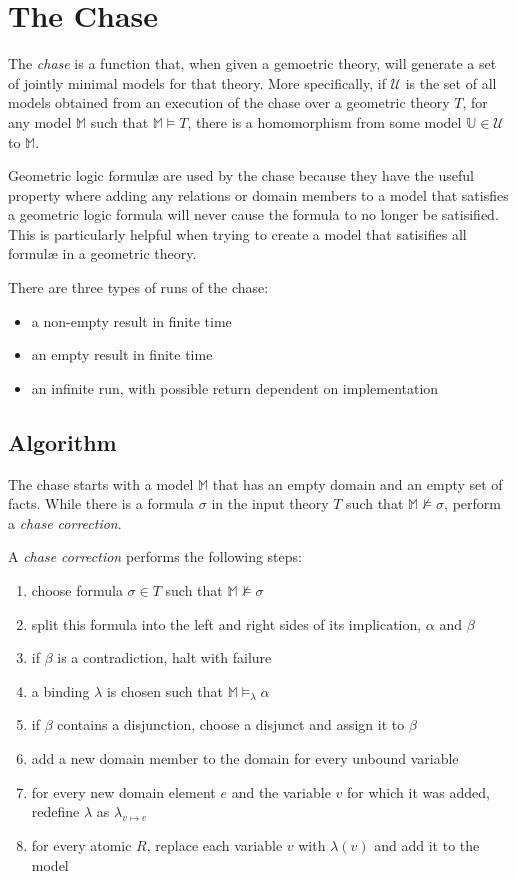 \section{The Chase}

	The \emph{chase} is a function that, when given a gemoetric theory, will
	generate a set of jointly minimal models for that theory. More
	specifically, if $\mathcal{U}$ is the set of all models obtained from an
	execution of the chase over a geometric theory $T$, for any model
	$\mathbb{M}$ such that $\mathbb{M} \models T$, there is a homomorphism from
	some model $\mathbb{U} \in \mathcal{U}$ to $\mathbb{M}$.

	Geometric logic formul{\ae} are used by the chase because they have the
	useful property where adding any relations or domain members to a model
	that satisfies a geometric logic formula will never cause the formula to no
	longer be satisified. This is particularly helpful when trying to create a
	model that satisifies all formul{\ae} in a geometric theory.

	There are three types of runs of the chase:
	\begin{itemize}
	\item a non-empty result in finite time
	\item an empty result in finite time
	\item an infinite run, with possible return dependent on implementation
	\end{itemize}

	\subsection{Algorithm}

		The chase starts with a model $\mathbb{M}$ that has an empty domain and
		an empty set of facts. While there is a formula $\sigma$ in the input
		theory $T$ such that $\mathbb{M} \not\models \sigma$, perform a
		\emph{chase correction}.

		A \emph{chase correction} performs the following steps:
		\begin{enumerate}
		\item choose formula $\sigma \in T$ such that $\mathbb{M} \not\models \sigma$
		\item split this formula into the left and right sides of its implication, $\alpha$ and $\beta$
		\item if $\beta$ is a contradiction, halt with failure
		\item a binding $\lambda$ is chosen such that $\mathbb{M} \models_\lambda \alpha$
		\item if $\beta$ contains a disjunction, choose a disjunct and assign it to $\beta$
		\item add a new domain member to the domain for every unbound variable
		\item for every new domain element $e$ and the variable $v$ for which it was added, redefine $\lambda$ as $\lambda_{v \mapsto e}$
		\item for every atomic $R$, replace each variable $v$ with $\lambda(v)$ and add it to the model
		\end{enumerate}

